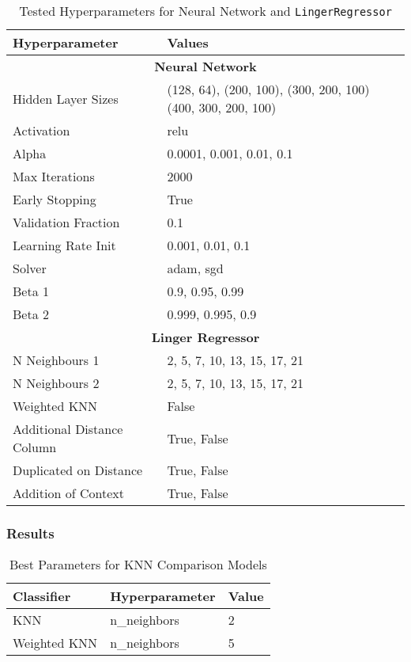 \documentclass[a4paper, 12pt]{report}
\begin{document}
\begin{table}[H]
    \centering
    \caption{Tested Hyperparameters for Neural Network and \texttt{LingerRegressor}}
    \label{tab:hyperparameters_abalone}
    \begin{tabular}{|l|l|}
    \hline
    \textbf{Hyperparameter} & \textbf{Values} \\ \hline
    \multicolumn{2}{|c|}{\textbf{Neural Network}} \\ \hline
    Hidden Layer Sizes &  (128, 64), (200, 100), (300, 200, 100) (400, 300, 200, 100)\\ \hline
    Activation & relu \\ \hline
    Alpha & 0.0001, 0.001, 0.01, 0.1 \\ \hline
    Max Iterations & 2000 \\ \hline
    Early Stopping & True \\ \hline
    Validation Fraction & 0.1 \\ \hline
    Learning Rate Init & 0.001, 0.01, 0.1 \\ \hline
    Solver & adam, sgd \\ \hline
    Beta 1 & 0.9, 0.95, 0.99 \\ \hline
    Beta 2 & 0.999, 0.995, 0.9 \\ \hline
    \multicolumn{2}{|c|}{\textbf{Linger Regressor}} \\ \hline
    N Neighbours 1 & 2, 5, 7, 10, 13, 15, 17, 21 \\ \hline
    N Neighbours 2 & 2, 5, 7, 10, 13, 15, 17, 21 \\ \hline
    Weighted KNN & False \\ \hline
    Additional Distance Column & True, False \\ \hline
    Duplicated on Distance & True, False \\ \hline
    Addition of Context & True, False \\ \hline
    \end{tabular}
\end{table}
\clearpage

\subsubsection{Results}


\begin{table}[H]
    \centering
    \caption{Best Parameters for KNN Comparison Models}
    \label{tab:best_parameters_combined_knn_exp2}
    \begin{tabular}{|l|l|l|}
    \toprule
    \textbf{Classifier} & \textbf{Hyperparameter} & \textbf{Value} \\
    \midrule
    KNN & n\_neighbors & 2 \\
    Weighted KNN & n\_neighbors & 5 \\
    \bottomrule
\end{tabular}
\end{table}
\end{document}
